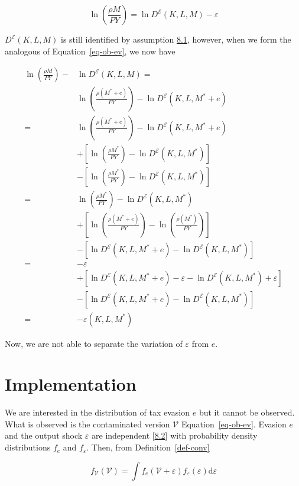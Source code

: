 \documentclass[
  12pt]{article}
\theoremstyle{definition}
\theoremstyle{remark}
\begin{document}
\[
\ln\left(\frac{\rho M}{PY}\right)=\ln D^{\mathcal{E}}(K,L,M)-\varepsilon
\]

\(D^{\mathcal{E}}(K,L,M)\) is still identified by assumption
\hyperref[ass-non-ev]{8.1}, however, when we form the analogous of
Equation~\ref{eq-ob-ev}, we now have

\[
\begin{aligned}
\ln\left(\frac{\rho M}{PY}\right)-&\ln D^{\mathcal{E}}(K,L,M)=\\
&\ln\left(\frac{\rho(M^*+e)}{PY}\right)-\ln D^{\mathcal{E}}(K,L,M^*+e)\\
=&\ln\left(\frac{\rho(M^*+e)}{PY}\right)-\ln D^{\mathcal{E}}(K,L,M^*+e)\\
&+\left[\ln\left(\frac{\rho M^*}{PY}\right)-\ln D^{\mathcal{E}}(K,L,M^*)\right]\\
&-\left[\ln\left(\frac{\rho M^*}{PY}\right)-\ln D^{\mathcal{E}}(K,L,M^*)\right] \\
=&\ln\left(\frac{\rho M^*}{PY}\right)-\ln D^{\mathcal{E}}(K,L,M^*) \\
&+\left[\ln\left(\frac{\rho(M^*+e)}{PY}\right)-\ln\left(\frac{\rho(M^*)}{PY}\right)\right]\\
&-\left[\ln D^{\mathcal{E}}(K,L,M^*+e)-\ln D^{\mathcal{E}}(K,L,M^*)\right]\\
=& -\varepsilon \\
&+\left[\ln D^{\mathcal{E}}(K,L,M^*+e)-\varepsilon-\ln D^{\mathcal{E}}(K,L,M^*)+\varepsilon\right]\\
&-\left[\ln D^{\mathcal{E}}(K,L,M^*+e)-\ln D^{\mathcal{E}}(K,L,M^*)\right]\\
=& -\varepsilon(K,L,M^*)
\end{aligned}
\]

Now, we are not able to separate the variation of \(\varepsilon\) from
\(e\).

\section{Implementation}\label{implementation}

We are interested in the distribution of tax evasion \(e\) but it cannot
be observed. What is observed is the contaminated version
\(\mathcal{V}\) Equation~\ref{eq-ob-ev}. Evasion \(e\) and the output
shock \(\varepsilon\) are independent {[}\hyperref[ass-ind]{8.2}{]} with
probability density distributions \(f_e\) and \(f_{\varepsilon}\). Then,
from Definition~\ref{def-conv}

\[
f_{\mathcal{V}}(\mathcal{V})=\int f_e(\mathcal{V}+\varepsilon)f_{\varepsilon}(\varepsilon)\text{d}\varepsilon
\]
\end{document}
